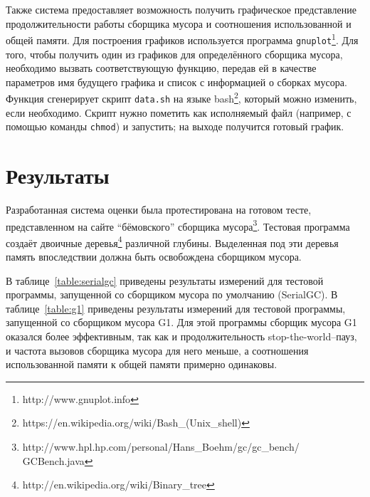 Также система предоставляет возможность получить графическое представление
продолжительности работы сборщика мусора и соотношения использованной и общей 
памяти. Для построения графиков
используется программа \texttt{gnuplot}\footnote{http://www.gnuplot.info}.
Для того, чтобы получить один из графиков для определённого сборщика 
мусора, необходимо вызвать соответствующую функцию, передав ей в качестве параметров
имя будущего графика и список с информацией о сборках мусора. Функция
сгенерирует скрипт \texttt{data.sh} на языке bash\footnote{https://en.wikipedia.org/wiki/Bash\_(Unix\_shell)}, который можно изменить, если необходимо.
Скрипт нужно пометить как исполняемый файл (например,
с помощью команды \texttt{chmod}) и запустить; на выходе получится готовый график.

\section{Результаты}
Разработанная система оценки была протестирована на готовом тесте, представленном 
на сайте ``бёмовского'' сборщика мусора\footnote{http://www.hpl.hp.com/personal/Hans\_Boehm/gc/gc\_bench/\\
GCBench.java}.
Тестовая программа создаёт двоичные деревья\footnote{http://en.wikipedia.org/wiki/Binary\_tree}
различной глубины. Выделенная под эти деревья память впоследствии должна быть освобождена сборщиком мусора.

В таблице~\ref{table:serialgc} приведены результаты измерений для тестовой программы, запущенной со сборщиком мусора по умолчанию (SerialGC).
В таблице~\ref{table:g1} приведены результаты измерений для тестовой программы, 
запущенной со сборщиком мусора G1. Для этой программы сборщик мусора G1 оказался
более эффективным, так как и продолжительность stop-the-world--пауз, и частота вызовов 
сборщика мусора для него меньше, а соотношения использованной памяти к общей памяти
примерно одинаковы.

